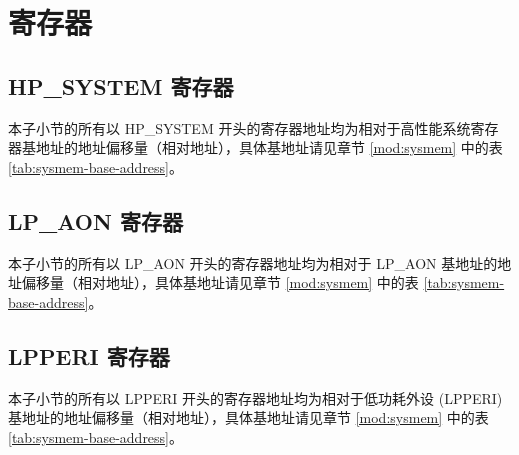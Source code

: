 \documentclass[main\_\_CN.tex]{subfiles}
\begin{document}
\clearpage
\section{寄存器}

\subsection{HP\_SYSTEM 寄存器}
\label{sec:sysreg-reg-sysreg}

本子小节的所有以 HP\_SYSTEM 开头的寄存器地址均为相对于高性能系统寄存器基地址的地址偏移量（相对地址），具体基地址请见章节 \ref{mod:sysmem} \textit{} 中的表 \ref{tab:sysmem-base-address}。



\subsection{LP\_AON 寄存器}
\label{sec:sysreg-reg-lpaon}

本子小节的所有以 LP\_AON 开头的寄存器地址均为相对于 LP\_AON 基地址的地址偏移量（相对地址），具体基地址请见章节 \ref{mod:sysmem} \textit{} 中的表 \ref{tab:sysmem-base-address}。



\subsection{LPPERI 寄存器}
\label{sec:sysreg-reg-lpperi}

本子小节的所有以 LPPERI 开头的寄存器地址均为相对于低功耗外设 (LPPERI) 基地址的地址偏移量（相对地址），具体基地址请见章节 \ref{mod:sysmem} \textit{} 中的表 \ref{tab:sysmem-base-address}。


\end{document}
